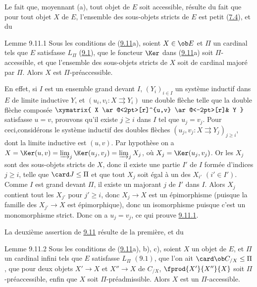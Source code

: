 Le fait que, moyennant (a), tout objet de $E$ soit accessible,
résulte du fait que pour tout objet $X$ de $E$, l'ensemble des
sous-objets stricts de $E$ est petit (\hyperref[I.prop7.4]{7.4}), et du

\begin{enonce*}{Lemme 9.11.1}
Sous les conditions de (\hyperref[I.prop9.11]{9.11}a), soient $X\in \ob E$ et
$\Pi$ un cardinal tels que $E$ satisfasse $L_{\Pi}$
(\hyperref[I.def9.1]{9.1}), que le foncteur $\Ker$ dans (\hyperref[I.prop9.11]{9.11}a)
soit $\Pi$-accessible, et que l'ensemble des sous-objets stricts de
$X$ soit de cardinal majoré par $\Pi$. Alors $X$ est
$\Pi$-préaccessible.
\end{enonce*}

En effet, si $I$ est un ensemble grand devant $I$, $(Y_i)_{i\in I}$
un système inductif dans $E$ de limite inductive $Y$, et $(u_i,
v_i:X\rightrightarrows Y_i)$ une double flèche telle que la double
flèche composée $ \xymatrix{ X \ar@<2pt>[r]^{u,v} \ar@<-2pt>[r]& Y
}$ satisfasse $u=v$, prouvons qu'il existe $j\geq i$ dans $I$ tel
que $u_j=v_j$. Pour ceci,\pageoriginale considérons le système
inductif des doubles flèches $(u_j,v_j:X\rightrightarrows
Y_j)_{j\geq i}$, dont la limite inductive est $(u,v)$. Par hypothèse
on a $X=\Ker(u,v)=\varinjlim_j \Ker (u_j,v_j)=\varinjlim_j X_j$, où
$X_j=\Ker(u_j,v_j)$. Or les $X_j$ sont des sous-objets stricts de
$X$, donc il existe une partie $I'$ de $I$ formée d'indices $j\geq
i$, telle que $\card J\leq\Pi$ et que tout $X_j$ soit égal à un des
$X_{i'}$ $(i'\in I')$. Comme $I$ est grand devant $\Pi$, il existe
un majorant $j$ de $I'$ dans $I$. Alors $X_j$ contient tout les
$X_{j'}$ pour $j'\geq i$, donc $X_j\rightarrow X$ est un
épimorphisme (puisque la famille des $X_{j'}\rightarrow X$ est
épimorphique), donc un isomorphisme puisque c'est un monomorphisme
strict. Donc on a $u_j=v_j$, ce qui prouve \hyperref[I.lem9.11.1]{9.11.1}.

La deuxième assertion de \hyperref[I.prop9.11]{9.11} résulte de la première, et
du

\begin{enonce*}{Lemme 9.11.2}
Sous les conditions de (\hyperref[I.prop9.11]{9.11}a), b), c), soient $X$ un
objet de $E$, et $\Pi$ un cardinal infini tels que $E$ satisfasse
$L_{\Pi}$ $(9.1)$, que l'on ait $\card \ob C_{/X}\leq \Pi$, que pour
deux objets $X'\rightarrow X$ et $X''\rightarrow X$ de $C_{/X}$,
$\fprod{X'}{X''}{X}$ soit $\Pi$-préaccessible, enfin que $X$ soit
$\Pi$-préadmissible. Alors $X$ est un $\Pi$-accessible.
\end{enonce*}

